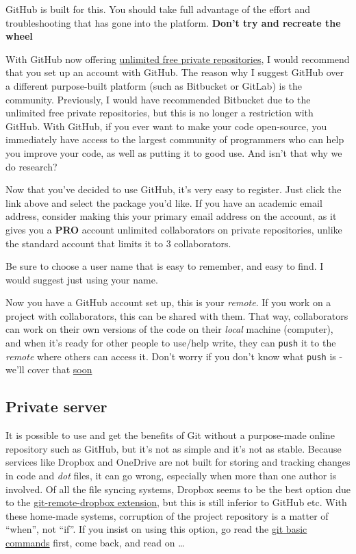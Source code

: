 \documentclass[]{book}
\begin{document}
GitHub is built for this. You should take full advantage of the effort and troubleshooting that has gone into the platform. \textbf{Don't try and recreate the wheel}

With GitHub now offering \href{https://Github.com/pricing}{unlimited free private repositories}, I would recommend that you set up an account with GitHub. The reason why I suggest GitHub over a different purpose-built platform (such as Bitbucket or GitLab) is the community. Previously, I would have recommended Bitbucket due to the unlimited free private repositories, but this is no longer a restriction with GitHub. With GitHub, if you ever want to make your code open-source, you immediately have access to the largest community of programmers who can help you improve your code, as well as putting it to good use. And isn't that why we do research?

Now that you've decided to use GitHub, it's very easy to register. Just click the link above and select the package you'd like. If you have an academic email address, consider making this your primary email address on the account, as it gives you a \textbf{PRO} account unlimited collaborators on private repositories, unlike the standard account that limits it to 3 collaborators.

Be sure to choose a user name that is easy to remember, and easy to find. I would suggest just using your name.

Now you have a GitHub account set up, this is your \emph{remote}. If you work on a project with collaborators, this can be shared with them. That way, collaborators can work on their own versions of the code on their \emph{local} machine (computer), and when it's ready for other people to use/help write, they can \texttt{push} it to the \emph{remote} where others can access it. Don't worry if you don't know what \texttt{push} is - we'll cover that \protect\hyperlink{basic-commands}{soon}

\hypertarget{private-server}{%
\subsection{Private server}\label{private-server}}

It is possible to use and get the benefits of Git without a purpose-made online repository such as GitHub, but it's not as simple and it's not as stable. Because services like Dropbox and OneDrive are not built for storing and tracking changes in code and \emph{dot} files, it can go wrong, especially when more than one author is involved. Of all the file syncing systems, Dropbox seems to be the best option due to the \href{https://github.com/anishathalye/git-remote-dropbox}{git-remote-dropbox extension}, but this is still inferior to GitHub etc. With these home-made systems, corruption of the project repository is a matter of ``when'', not ``if''. If you insist on using this option, go read the \protect\hyperlink{basic-commands}{git basic commands} first, come back, and read on \ldots{}
\end{document}
